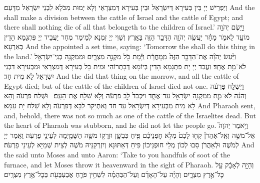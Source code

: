 {וְיַפְרֵישׁ יְיָ בֵּין בְּעִירָא דְּיִשְׂרָאֵל וּבֵין בְּעִירָא דְּמִצְרָאֵי וְלָא יְמוּת מִכֹּלָא לִבְנֵי יִשְׂרָאֵל מִדָּעַם׃}
{And the \lord\space shall make a division between the cattle of Israel and the cattle of Egypt; and there shall nothing die of all that belongeth to the children of Israel.’}{}
{וַיָּ֥שֶׂם יְהֹוָ֖ה מוֹעֵ֣ד לֵאמֹ֑ר מָחָ֗ר יַעֲשֶׂ֧ה יְהֹוָ֛ה הַדָּבָ֥ר הַזֶּ֖ה בָּאָֽרֶץ׃}
{וְשַׁוִּי יְיָ זִמְנָא לְמֵימַר מְחַר יַעֲבֵיד יְיָ פִּתְגָמָא הָדֵין בְּאַרְעָא׃}
{And the \lord\space appointed a set time, saying: ‘Tomorrow the \lord\space shall do this thing in the land.’}{}
{וַיַּ֨עַשׂ יְהֹוָ֜ה אֶת־הַדָּבָ֤ר הַזֶּה֙ מִֽמׇּחֳרָ֔ת וַיָּ֕מׇת כֹּ֖ל מִקְנֵ֣ה מִצְרָ֑יִם וּמִמִּקְנֵ֥ה בְנֵֽי־יִשְׂרָאֵ֖ל לֹא־מֵ֥ת אֶחָֽד׃}
{וַעֲבַד יְיָ יָת פִּתְגָמָא הָדֵין בְּיוֹמָא דְּבָתְרוֹהִי וּמִית כָּל בְּעִירָא דְּמִצְרָאֵי וּמִבְּעִירָא דִּבְנֵי יִשְׂרָאֵל לָא מִית חַד׃}
{And the \lord\space did that thing on the morrow, and all the cattle of Egypt died; but of the cattle of the children of Israel died not one.}{}
{וַיִּשְׁלַ֣ח פַּרְעֹ֔ה וְהִנֵּ֗ה לֹא־מֵ֛ת מִמִּקְנֵ֥ה יִשְׂרָאֵ֖ל עַד־אֶחָ֑ד וַיִּכְבַּד֙ לֵ֣ב פַּרְעֹ֔ה וְלֹ֥א שִׁלַּ֖ח אֶת־הָעָֽם׃ \petucha }
{וּשְׁלַח פַּרְעֹה וְהָא לָא מִית מִבְּעִירָא דְּיִשְׂרָאֵל עַד חַד וְאִתְיַקַּר לִבָּא דְּפַרְעֹה וְלָא שַׁלַּח יָת עַמָּא׃}
{And Pharaoh sent, and, behold, there was not so much as one of the cattle of the Israelites dead. But the heart of Pharaoh was stubborn, and he did not let the people go.}{}
{וַיֹּ֣אמֶר יְהֹוָה֮ אֶל־מֹשֶׁ֣ה וְאֶֽל־אַהֲרֹן֒ קְח֤וּ לָכֶם֙ מְלֹ֣א חׇפְנֵיכֶ֔ם פִּ֖יחַ כִּבְשָׁ֑ן וּזְרָק֥וֹ מֹשֶׁ֛ה הַשָּׁמַ֖יְמָה לְעֵינֵ֥י פַרְעֹֽה׃
}
{וַאֲמַר יְיָ לְמֹשֶׁה וּלְאַהֲרֹן סַבוּ לְכוֹן מְלֵי חוּפְנֵיכוֹן פִּיחַ דְּאַתּוּנָא וְיִזְרְקִנֵּיהּ מֹשֶׁה לְצֵית שְׁמַיָּא לְעֵינֵי פַרְעֹה׃}
{And the \lord\space said unto Moses and unto Aaron: ‘Take to you handfuls of soot of the furnace, and let Moses throw it heavenward in the sight of Pharaoh.}{}
{וְהָיָ֣ה לְאָבָ֔ק עַ֖ל כׇּל־אֶ֣רֶץ מִצְרָ֑יִם וְהָיָ֨ה עַל־הָאָדָ֜ם וְעַל־הַבְּהֵמָ֗ה לִשְׁחִ֥ין פֹּרֵ֛חַ אֲבַעְבֻּעֹ֖ת בְּכׇל־אֶ֥רֶץ מִצְרָֽיִם׃
}
